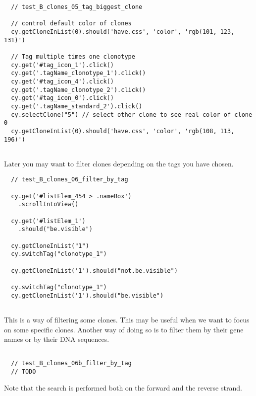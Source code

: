 \begin{verbatim}
  // test_B_clones_05_tag_biggest_clone

  // control default color of clones
  cy.getCloneInList(0).should('have.css', 'color', 'rgb(101, 123, 131)')

  // Tag multiple times one clonotype
  cy.get('#tag_icon_1').click()
  cy.get('.tagName_clonotype_1').click()
  cy.get('#tag_icon_4').click()
  cy.get('.tagName_clonotype_2').click()
  cy.get('#tag_icon_0').click()
  cy.get('.tagName_standard_2').click()
  cy.selectClone("5") // select other clone to see real color of clone 0
  cy.getCloneInList(0).should('have.css', 'color', 'rgb(108, 113, 196)')


\end{verbatim}

Later you may want to filter clones depending on the tags you have chosen.


\begin{verbatim}
  // test_B_clones_06_filter_by_tag

  cy.get('#listElem_454 > .nameBox')
    .scrollIntoView()

  cy.get('#listElem_1')
    .should("be.visible")

  cy.getCloneInList("1")
  cy.switchTag("clonotype_1")

  cy.getCloneInList('1').should("not.be.visible")

  cy.switchTag("clonotype_1")
  cy.getCloneInList('1').should("be.visible")


\end{verbatim}

This is a way of filtering some clones. This may be useful when we want to
focus on some specific clones. Another way of doing so is to filter them by
their gene names or by their DNA sequences.  


\begin{verbatim}

  // test_B_clones_06b_filter_by_tag
  // TODO

\end{verbatim}

Note that the search is performed both on the forward and the reverse strand.

